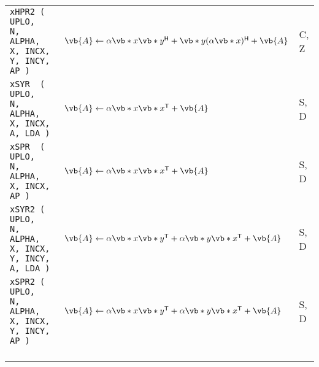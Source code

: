 \documentclass[10pt,a3paper, landscape]{article}
\newcommand{\T}{\mathsf{T}}
\renewcommand{\H}{\mathsf{H}}
\begin{document}
\begin{tabular}{lll}
		\verb|xHPR2 ( UPLO,                 N, ALPHA, X, INCX, Y, INCY, AP )                           |                                                                    & $\vb{A} \gets \alpha \vb*{x}\vb*{y}^{\H} + \vb*{y}(\alpha \vb*{x})^{\H} + \vb{A}$                                                                                                                                                                            & C, Z               \\
		\verb|xSYR  ( UPLO,                 N, ALPHA, X, INCX,          A, LDA )                       |                                                                    & $\vb{A} \gets \alpha \vb*{x}\vb*{x}^{\T} + \vb{A}$                                                                                                                                                                                                           & S, D               \\
		\verb|xSPR  ( UPLO,                 N, ALPHA, X, INCX,          AP )                           |                                                                    & $\vb{A} \gets \alpha \vb*{x}\vb*{x}^{\T} + \vb{A}$                                                                                                                                                                                                           & S, D               \\
		\verb|xSYR2 ( UPLO,                 N, ALPHA, X, INCX, Y, INCY, A, LDA )                       |                                                                    & $\vb{A} \gets \alpha \vb*{x}\vb*{y}^{\T} + \alpha \vb*{y}\vb*{x}^{\T} + \vb{A}$                                                                                                                                                                              & S, D               \\
		\verb|xSPR2 ( UPLO,                 N, ALPHA, X, INCX, Y, INCY, AP )                           |                                                                    & $\vb{A} \gets \alpha \vb*{x}\vb*{y}^{\T} + \alpha \vb*{y}\vb*{x}^{\T} + \vb{A}$                                                                                                                                                                              & S, D               \\
		\verb|                                                                                         |                                                                    &                                                                                                                                                                                                                                                              &                    \\

\end{tabular}
\end{document}
